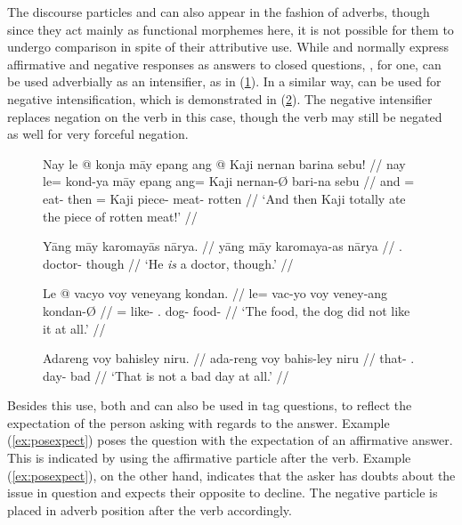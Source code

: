 The discourse particles  and  can also
appear in the fashion of adverbs, though since they act mainly as functional
morphemes here, it is not possible for them to undergo comparison in spite of
their attributive use. While  and 
normally express affirmative and negative responses as answers to closed
questions, , for one, can be used adverbially as an
intensifier, as in (\ref{ex:maayintens}). In a similar way,  can
be used for negative intensification, which is demonstrated in 
(\ref{ex:voyintens}). The negative intensifier replaces negation on the verb in
this case, though the verb may still be negated as well for very forceful
negation.

\begin{figure}[h]
\pex\label{ex:maayintens}
\a\begingl
	\gla Nay le @ konja māy epang ang @ Kaji nernan barina sebu! //
	\glb nay le= kond-ya māy epang ang= Kaji nernan-Ø bari-na sebu //
	\glc and \PatTI{}= eat-\TsgM{} \Int{} then \Aarg{}= Kaji piece-\Top{} 
		meat-\Gen{} rotten //
	\glft `And then Kaji totally ate the piece of rotten meat!' //
\endgl

\a\begingl
	\gla Yāng māy karomayās nārya. //
	\glb yāng māy karomaya-as nārya //
	\glc \TsgM{}.\Aarg{} \Int{} doctor-\Parg{} though // 
	\glft `He \emph{is} a doctor, though.' //
\endgl
\xe
\end{figure}

\begin{figure}[h]
\pex\label{ex:voyintens}
\a\begingl
	\gla Le @ vacyo voy veneyang kondan. //
	\glb le= vac-yo voy veney-ang kondan-Ø //
	\glc \PatTI{}= like-\TsgN{} \Int{}.\Neg{} dog-\Aarg{} food-\Top{} //
	\glft `The food, the dog did not like it at all.' //
\endgl

\a\begingl
	\gla Adareng voy bahisley niru. //
	\glb ada-reng voy bahis-ley niru //
	\glc that-\AargI{} \Int{}.\Neg{} day-\PargI{} bad // 
	\glft `That is not a bad day at all.' //
\endgl
\xe
\end{figure}

Besides this use, both  and  can also be used in
tag questions, to reflect the expectation of the person asking with regards to
the answer. Example (\ref{ex:posexpect}) poses the question with the
expectation of an affirmative answer. This is indicated by using the
affirmative particle  after the verb. Example 
(\ref{ex:posexpect}), on the other hand, indicates that the asker has doubts
about the issue in question and expects their opposite to decline. The negative
particle  is placed in adverb position after the verb
accordingly.

